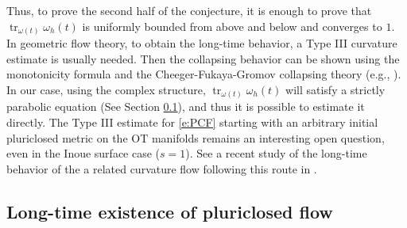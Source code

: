 \documentclass[12pt]{amsart}
\numberwithin{equation}{section}
\numberwithin{prop}{section}
\theoremstyle{definition}
\begin{document}
Thus, to prove the second half of the conjecture, it is enough to prove that $\operatorname{tr}_{\omega(t)} \omega_h(t)$ is uniformly bounded from above and below and converges to $1$.  In geometric flow theory, to obtain the long-time behavior, a Type III curvature estimate is usually needed. Then the collapsing behavior can be shown using the monotonicity formula and the Cheeger-Fukaya-Gromov collapsing theory (e.g., \cite{Lott1, LottDR}).  In our case, using the complex structure, $\operatorname{tr}_{\omega(t)}\omega_h(t)$ will satisfy a strictly parabolic equation (See Section \ref{s:long time section}), and thus it is possible to estimate it directly.  The Type III estimate for \eqref{e:PCF} starting with an arbitrary initial pluriclosed metric on the OT manifolds remains an interesting open question, even in the Inoue surface case ($s=1$).
See a recent study of the long-time behavior of the a related curvature flow following this route in \cite{GuoWang-alpha-Ricci-flow}.
%
%
\subsection{Long-time existence of pluriclosed flow}\label{s:long time section}
%
%
\end{document}
